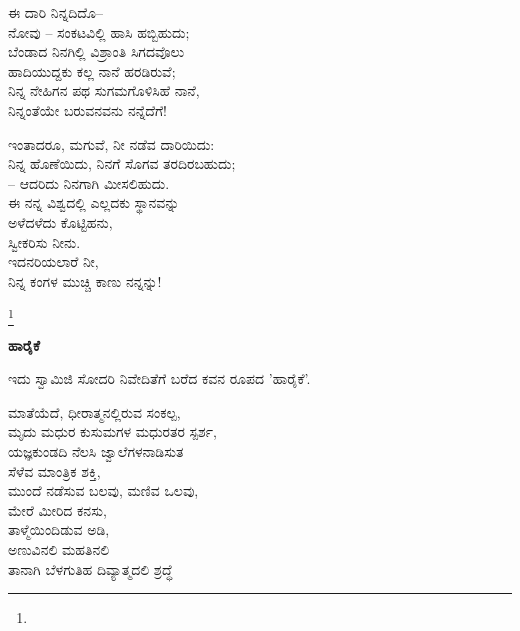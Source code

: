 \begin{myquote}
ಈ ದಾರಿ ನಿನ್ನದಿದೊ–\\ನೋವು – ಸಂಕಟವಿಲ್ಲಿ ಹಾಸಿ ಹಬ್ಬಿಹುದು;\\ಬೆಂಡಾದ ನಿನಗಿಲ್ಲಿ ವಿಶ್ರಾಂತಿ ಸಿಗದವೊಲು\\ಹಾದಿಯುದ್ದಕು ಕಲ್ಲ ನಾನೆ ಹರಡಿರುವೆ;\\ನಿನ್ನ ನೇಹಿಗನ ಪಥ ಸುಗಮಗೊಳಿಸಿಹೆ ನಾನೆ,\\ನಿನ್ನಂತೆಯೇ ಬರುವನವನು ನನ್ನೆದೆಗೆ!
\end{myquote}

\begin{myquote}
ಇಂತಾದರೂ, ಮಗುವೆ, ನೀ ನಡೆವ ದಾರಿಯಿದು:\\ನಿನ್ನ ಹೊಣೆಯಿದು, ನಿನಗೆ ಸೊಗವ ತರದಿರಬಹುದು;\\
– ಆದರಿದು ನಿನಗಾಗಿ ಮೀಸಲಿಹುದು.\\ಈ ನನ್ನ ವಿಶ್ವದಲ್ಲಿ ಎಲ್ಲದಕು ಸ್ಥಾನವನ್ನು\\ಅಳೆದಳೆದು ಕೊಟ್ಟಿಹನು,\\ಸ್ವೀಕರಿಸು ನೀನು.\\ಇದನರಿಯಲಾರೆ ನೀ,\\ನಿನ್ನ ಕಂಗಳ ಮುಚ್ಚಿ ಕಾಣು ನನ್ನನ್ನು!
\end{myquote}

\protect\footnote{}

\begin{myquote}
\end{myquote}

\begin{center}
\textbf{ಹಾರೈಕೆ}
\end{center}

\begin{center}
ಇದು ಸ್ವಾಮಿಜಿ ಸೋದರಿ ನಿವೇದಿತೆಗೆ ಬರೆದ ಕವನ ರೂಪದ 'ಹಾರೈಕೆ'.
\end{center}

\begin{myquote}
ಮಾತೆಯೆದೆ, ಧೀರಾತ್ಮನಲ್ಲಿರುವ ಸಂಕಲ್ಪ,\\ಮೃದು ಮಧುರ ಕುಸುಮಗಳ ಮಧುರತರ ಸ್ಪರ್ಶ,\\ಯಜ್ಞಕುಂಡದಿ ನೆಲಸಿ ಜ್ವಾಲೆಗಳನಾಡಿಸುತ\\ಸೆಳೆವ ಮಾಂತ್ರಿಕ ಶಕ್ತಿ,\\ಮುಂದೆ ನಡೆಸುವ ಬಲವು, ಮಣಿವ ಒಲವು,\\ಮೇರೆ ಮೀರಿದ ಕನಸು,\\ತಾಳ್ಮೆಯಿಂದಿಡುವ ಅಡಿ,\\ಅಣುವಿನಲಿ ಮಹತಿನಲಿ\\ತಾನಾಗಿ ಬೆಳಗುತಿಹ ದಿವ್ಯಾತ್ಮದಲಿ ಶ್ರದ್ಧೆ
\end{myquote}

